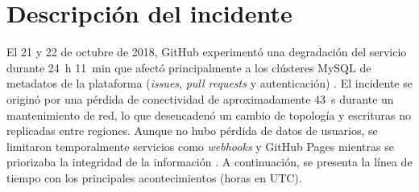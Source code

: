 \documentclass[11pt,a4paper]{article}
\begin{document}
\section{Descripci\'on del incidente}
El 21 y 22 de octubre de 2018, GitHub experiment\'o una degradaci\'on del servicio durante 24~h 11~min que afect\'o principalmente a los cl\'usteres MySQL de metadatos de la plataforma (\textit{issues}, \textit{pull requests} y autenticaci\'on) \cite{github2018}. El incidente se origin\'o por una p\'erdida de conectividad de aproximadamente 43~s durante un mantenimiento de red, lo que desencaden\'o un cambio de topolog\'ia y escrituras no replicadas entre regiones. Aunque no hubo p\'erdida de datos de usuarios, se limitaron temporalmente servicios como \textit{webhooks} y GitHub Pages mientras se priorizaba la integridad de la informaci\'on \cite{github2018}. A continuaci\'on, se presenta la l\'inea de tiempo con los principales acontecimientos (horas en UTC).
\end{document}
